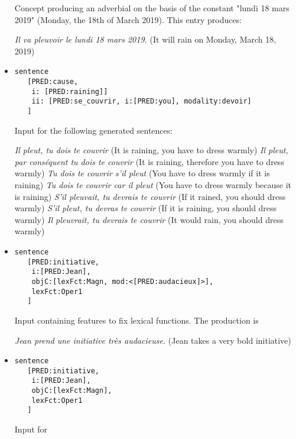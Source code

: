 \documentclass[11pt]{article}
\begin{document}
\begin{itemize}
Concept producing an adverbial on the basis of the
constant "lundi 18 mars 2019" (Monday, the 18th of March 2019). This entry produces:

\begin{exe}
\ex \textit{Il va pleuvoir le lundi 18 mars 2019.} (It will rain on Monday, March 18, 2019) 
\end{exe}

\item 
\begin{verbatim}
sentence 
   [PRED:cause, 
    i: [PRED:raining]]
    ii: [PRED:se_couvrir, i:[PRED:you], modality:devoir]
   ]
\end{verbatim}

Input for the following generated sentences:
\begin{exe}
\ex \begin{xlist} 
\ex \textit{Il pleut, tu dois te couvrir} (It is raining, you have to dress warmly)
\ex \textit{Il pleut, par conséquent tu dois te couvrir} (It is raining, therefore you have to dress warmly)
\ex \textit{Tu dois te couvrir s'il pleut} (You have to dress warmly if it is raining)
\ex \textit{Tu dois te couvrir car il pleut} (You have to dress warmly because it is raining)
\ex \textit{S'il pleuvait, tu devrais te couvrir} (If it rained, you should dress warmly)
\ex \textit{S'il pleut, tu devras te couvrir} (If it is raining, you should dress warmly)
\ex \textit{Il pleuvrait, tu devrais te couvrir} (It would rain, you should dress warmly)
\end{xlist}
\end{exe}

\item 
\begin{verbatim}
sentence 
   [PRED:initiative, 
    i:[PRED:Jean], 
    objC:[lexFct:Magn, mod:<[PRED:audacieux]>], 
    lexFct:Oper1
   ]
\end{verbatim}

Input containing features to fix lexical functions. The
production is 
\begin{exe}
\ex \textit{Jean prend une initiative très audacieuse.} (Jean takes a very bold initiative)
\end{exe}

\item 
\begin{verbatim}
sentence 
   [PRED:initiative, 
    i:[PRED:Jean], 
    objC:[lexFct:Magn], 
    lexFct:Oper1
   ]
\end{verbatim}

Input for


\end{itemize}
\end{document}
